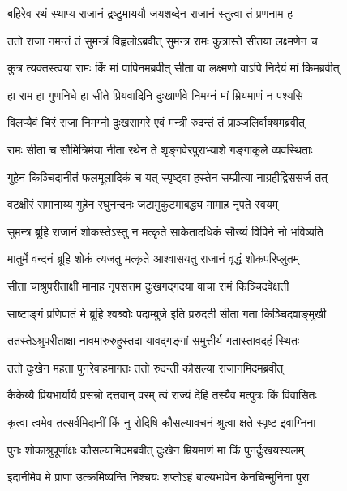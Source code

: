 \twolineshloka
{बहिरेव रथं स्थाप्य राजानं द्रष्टुमाययौ}
{जयशब्देन राजानं स्तुत्वा तं प्रणनाम ह} %

\twolineshloka
{ततो राजा नमन्तं तं सुमन्त्रं विह्वलोऽब्रवीत्}
{सुमन्त्र रामः कुत्रास्ते सीतया लक्ष्मणेन च} %

\twolineshloka
{कुत्र त्यक्तस्त्वया रामः किं मां पापिनमब्रवीत्}
{सीता वा लक्ष्मणो वाऽपि निर्दयं मां किमब्रवीत्} %

\twolineshloka
{हा राम हा गुणनिधे हा सीते प्रियवादिनि}
{दुःखार्णवे निमग्नं मां म्रियमाणं न पश्यसि} %

\twolineshloka
{विलप्यैवं चिरं राजा निमग्नो दुःखसागरे}
{एवं मन्त्री रुदन्तं तं प्राञ्जलिर्वाक्यमब्रवीत्} %

\twolineshloka
{रामः सीता च सौमित्रिर्मया नीता रथेन ते}
{शृङ्गवेरपुराभ्याशे गङ्गाकूले व्यवस्थिताः} %

\twolineshloka
{गुहेन किञ्चिदानीतं फलमूलादिकं च यत्}
{स्पृष्ट्वा हस्तेन सम्प्रीत्या नाग्रहीद्विससर्ज तत्} %

\twolineshloka
{वटक्षीरं समानाय्य गुहेन रघुनन्दनः}
{जटामुकुटमाबद्ध्य मामाह नृपते स्वयम्} %

\twolineshloka
{सुमन्त्र ब्रूहि राजानं शोकस्तेऽस्तु न मत्कृते}
{साकेतादधिकं सौख्यं विपिने नो भविष्यति} %

\twolineshloka
{मातुर्मे वन्दनं ब्रूहि शोकं त्यजतु मत्कृते}
{आश्वासयतु राजानं वृद्धं शोकपरिप्लुतम्} %

\twolineshloka
{सीता चाश्रुपरीताक्षी मामाह नृपसत्तम}
{दुःखगद्गदया वाचा रामं किञ्चिदवेक्षती} %

\twolineshloka
{साष्टाङ्गं प्रणिपातं मे ब्रूहि श्वश्र्वोः पदाम्बुजे}
{इति प्ररुदती सीता गता किञ्चिदवाङ्मुखी} %

\twolineshloka
{ततस्तेऽश्रुपरीताक्षा नावमारुरुहुस्तदा}
{यावद्गङ्गां समुत्तीर्य गतास्तावदहं स्थितः} %

\twolineshloka
{ततो दुःखेन महता पुनरेवाहमागतः}
{ततो रुदन्ती कौसल्या राजानमिदमब्रवीत्} %

\twolineshloka
{कैकेय्यै प्रियभार्यायै प्रसन्नो दत्तवान् वरम्}
{त्वं राज्यं देहि तस्यैव मत्पुत्रः किं विवासितः} %

\twolineshloka
{कृत्वा त्वमेव तत्सर्वमिदानीं किं नु रोदिषि}
{कौसल्यावचनं श्रुत्वा क्षते स्पृष्ट इवाग्निना} %

\twolineshloka
{पुनः शोकाश्रुपूर्णाक्षः कौसल्यामिदमब्रवीत्}
{दुःखेन म्रियमाणं मां किं पुनर्दुःखयस्यलम्} %

\twolineshloka
{इदानीमेव मे प्राणा उत्क्रमिष्यन्ति निश्चयः}
{शप्तोऽहं बाल्यभावेन केनचिन्मुनिना पुरा} %

